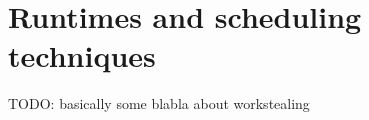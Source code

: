 \section{Runtimes and scheduling techniques}\label{sec:context:runtimes}

TODO: basically some blabla about workstealing


